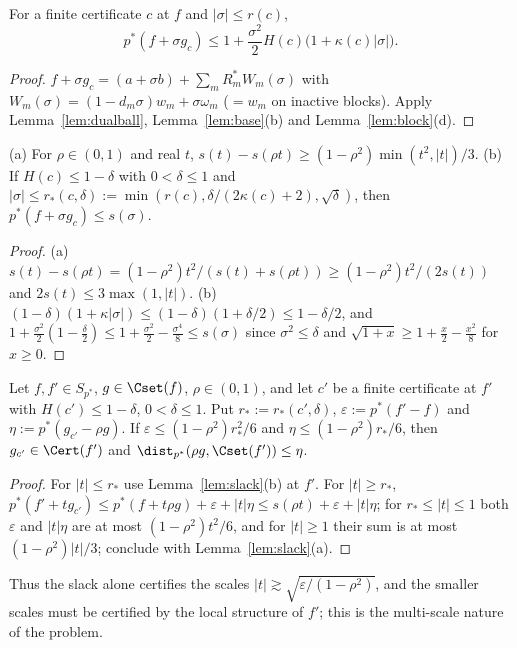\begin{proposition}\label{prop:expansion}
For a finite certificate $c$ at $f$ and $|\sigma|\le r(c)$,
\[
 p^*(f+\sigma g_c)\le1+\frac{\sigma^2}2H(c)\big(1+\kappa(c)|\sigma|\big).
\]
\end{proposition}

\begin{proof}
$f+\sigma g_c=(a+\sigma b)+\sum_mR_m^*W_m(\sigma)$ with
$W_m(\sigma)=(1-d_m\sigma)w_m+\sigma\omega_m$ ($=w_m$ on inactive blocks).
Apply Lemma~\ref{lem:dualball}, Lemma~\ref{lem:base}(b) and
Lemma~\ref{lem:block}(d).
\end{proof}

\begin{lemma}\label{lem:slack}
\textup{(a)} For $\rho\in(0,1)$ and real $t$,
$s(t)-s(\rho t)\ge(1-\rho^2)\min(t^2,|t|)/3$.
\textup{(b)} If $H(c)\le1-\delta$ with $0<\delta\le1$ and
$|\sigma|\le r_*(c,\delta):=\min(r(c),\delta/(2\kappa(c)+2),\sqrt\delta)$,
then $p^*(f+\sigma g_c)\le s(\sigma)$.
\end{lemma}

\begin{proof}
(a) $s(t)-s(\rho t)=(1-\rho^2)t^2/(s(t)+s(\rho t))\ge(1-\rho^2)t^2/(2s(t))$
and $2s(t)\le3\max(1,|t|)$.  (b) $(1-\delta)(1+\kappa|\sigma|)\le
(1-\delta)(1+\delta/2)\le1-\delta/2$, and $1+\frac{\sigma^2}2(1-\frac\delta
2)\le1+\frac{\sigma^2}2-\frac{\sigma^4}8\le s(\sigma)$ since
$\sigma^2\le\delta$ and $\sqrt{1+x}\ge1+\frac x2-\frac{x^2}8$ for $x\ge0$.
\end{proof}

\begin{proposition}\label{prop:scale}
Let $f,f'\in S_{p^*}$, $g\in\Cset(f)$, $\rho\in(0,1)$, and let $c'$ be a
finite certificate at $f'$ with $H(c')\le1-\delta$, $0<\delta\le1$.  Put
$r_*:=r_*(c',\delta)$, $\varepsilon:=p^*(f'-f)$ and
$\eta:=p^*(g_{c'}-\rho g)$.  If $\varepsilon\le(1-\rho^2)r_*^2/6$ and
$\eta\le(1-\rho^2)r_*/6$, then $g_{c'}\in\Cert(f')$ and
$\dist_{p^*}(\rho g,\Cset(f'))\le\eta$.
\end{proposition}

\begin{proof}
For $|t|\le r_*$ use Lemma~\ref{lem:slack}(b) at $f'$.  For $|t|\ge r_*$,
$p^*(f'+tg_{c'})\le p^*(f+t\rho g)+\varepsilon+|t|\eta\le
s(\rho t)+\varepsilon+|t|\eta$; for $r_*\le|t|\le1$ both $\varepsilon$
and $|t|\eta$ are at most $(1-\rho^2)t^2/6$, and for $|t|\ge1$ their sum
is at most $(1-\rho^2)|t|/3$; conclude with Lemma~\ref{lem:slack}(a).
\end{proof}

Thus the slack alone certifies the scales $|t|\gtrsim\sqrt{\varepsilon/(1-
\rho^2)}$, and the smaller scales must be certified by the local structure
of $f'$; this is the multi-scale nature of the problem.

